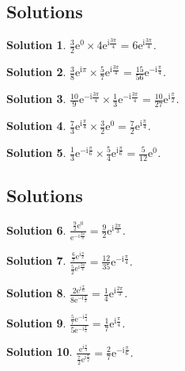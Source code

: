\documentclass[a4paper]{article}
\newtheorem{solution}{Solution}
\begin{document}
\subsection*{Solutions}
\begin{solution}
$\displaystyle \frac{3}{2}\mathrm{e}^{0}\times 4\mathrm{e}^{\mathrm{i}\frac{3 \pi }{4}}=6\mathrm{e}^{\mathrm{i}\frac{3 \pi }{4}}$.\end{solution}
\begin{solution}
$\displaystyle \frac{3}{8}\mathrm{e}^{\mathrm{i}\pi }\times \frac{5}{7}\mathrm{e}^{\mathrm{i}\frac{3 \pi }{4}}=\frac{15}{56}\mathrm{e}^{-\mathrm{i}\frac{\pi }{4}}$.\end{solution}
\begin{solution}
$\displaystyle \frac{10}{9}\mathrm{e}^{-\mathrm{i}\frac{3 \pi }{4}}\times \frac{1}{3}\mathrm{e}^{-\mathrm{i}\frac{3 \pi }{4}}=\frac{10}{27}\mathrm{e}^{\mathrm{i}\frac{\pi }{2}}$.\end{solution}
\begin{solution}
$\displaystyle \frac{7}{3}\mathrm{e}^{\mathrm{i}\frac{\pi }{4}}\times \frac{3}{2}\mathrm{e}^{0}=\frac{7}{2}\mathrm{e}^{\mathrm{i}\frac{\pi }{4}}$.\end{solution}
\begin{solution}
$\displaystyle \frac{1}{3}\mathrm{e}^{-\mathrm{i}\frac{\pi }{6}}\times
\frac{5}{4}\mathrm{e}^{\mathrm{i}\frac{\pi
  }{6}}=\frac{5}{12}\mathrm{e}^{0}$.\end{solution}
\subsection*{Solutions}
\begin{solution}
$\displaystyle \frac{\frac{9}{2}\mathrm{e}^{0}}{\mathrm{e}^{-\mathrm{i}\frac{2 \pi }{3}}}=\frac{9}{2}\mathrm{e}^{\mathrm{i}\frac{2 \pi }{3}}$.\end{solution}
\begin{solution}
$\displaystyle \frac{\frac{6}{7}\mathrm{e}^{\mathrm{i}\frac{\pi }{2}}}{\frac{5}{2}\mathrm{e}^{\mathrm{i}\frac{3 \pi }{4}}}=\frac{12}{35}\mathrm{e}^{-\mathrm{i}\frac{\pi }{4}}$.\end{solution}
\begin{solution}
$\displaystyle \frac{2\mathrm{e}^{\mathrm{i}\frac{\pi }{6}}}{8\mathrm{e}^{-\mathrm{i}\frac{\pi }{2}}}=\frac{1}{4}\mathrm{e}^{\mathrm{i}\frac{2 \pi }{3}}$.\end{solution}
\begin{solution}
$\displaystyle \frac{\frac{5}{7}\mathrm{e}^{-\mathrm{i}\frac{\pi }{4}}}{5\mathrm{e}^{-\mathrm{i}\frac{\pi }{2}}}=\frac{1}{7}\mathrm{e}^{\mathrm{i}\frac{\pi }{4}}$.\end{solution}
\begin{solution}
$\displaystyle \frac{\mathrm{e}^{\mathrm{i}\frac{\pi
    }{3}}}{\frac{7}{2}\mathrm{e}^{\mathrm{i}\frac{\pi
    }{2}}}=\frac{2}{7}\mathrm{e}^{-\mathrm{i}\frac{\pi
  }{6}}$.\end{solution}
\end{document}
